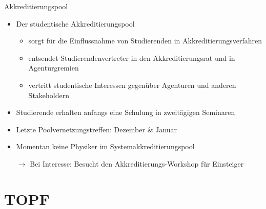 \documentclass[compress, aspectratio=169]{beamer}
\begin{document}
\begin{frame}{Akkreditierungspool}
    \begin{itemize}
        \item Der studentische Akkreditierungspool
        \begin{itemize}
        	\item sorgt für die Einflussnahme von Studierenden in Akkreditierungsverfahren
        	\item entsendet Studierendenvertreter in den Akkreditierungsrat und in Agenturgremien
        	\item vertritt studentische Interessen gegenüber Agenturen und anderen Stakeholdern
        \end{itemize}         
        \item Studierende erhalten anfangs eine Schulung in zweitägigen Seminaren
        \item Letzte Poolvernetzungstreffen: Dezember \& Januar
        \vspace{0.5cm}
        \item Momentan keine Physiker im Systemakkreditierungspool
        \item[$\rightarrow$] Bei Interesse: Besucht den Akkreditierungs-Workshop für Einsteiger
    \end{itemize}
\end{frame}


\section{TOPF}
\end{document}
